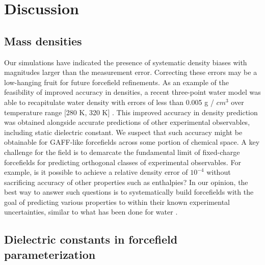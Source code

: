 \documentclass[aip, jcp, reprint]{revtex4-1}  %
\begin{document}

\section{Discussion}

\subsection{Mass densities}

Our simulations have indicated the presence of systematic density biases with magnitudes larger than the measurement error.  
Correcting these errors may be a low-hanging fruit for future forcefield refinements.
As an example of the feasibility of improved accuracy in densities, a recent three-point water model was able to recapitulate water density with errors of less than 0.005 g / $cm^{3}$ over temperature range [280 K, 320 K] \cite{wang2014building}.
This improved accuracy in density prediction was obtained alongside accurate predictions of other experimental observables, including static dielectric constant.  
We suspect that such accuracy might be obtainable for GAFF-like forcefields across some portion of chemical space.  
A key challenge for the field is to demarcate the fundamental limit of fixed-charge forcefields for predicting orthogonal classes of experimental observables.
For example, is it possible to achieve a relative density error of $10^{-4}$ without sacrificing accuracy of other properties such as enthalpies?
In our opinion, the best way to answer such questions is to systematically build forcefields with the goal of predicting various properties to within their known experimental uncertainties, similar to what has been done for water \cite{horn2004, wang2014building}.



\subsection{Dielectric constants in forcefield parameterization}
\end{document}
